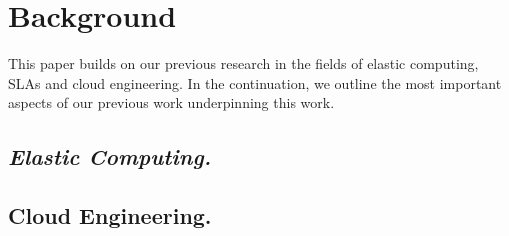 \section{Background}
\label{sec:Background}

This paper builds on our previous research in the 
fields of elastic computing, SLAs and cloud engineering.
In the continuation, we outline the most important
aspects of our previous work underpinning this work.

\subsection{\em Elastic Computing.}

\subsection{Cloud Engineering.}

